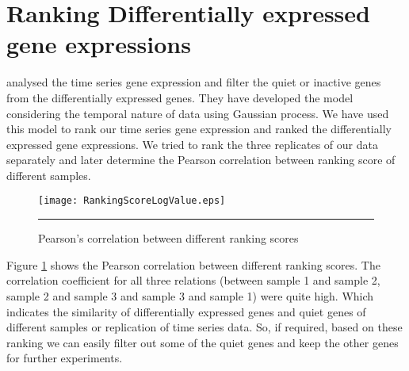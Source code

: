 \section{Ranking Differentially expressed gene expressions}
\cite{Kalaitzis:2011} analysed the time series gene expression and filter the quiet or inactive genes
from the differentially expressed genes. They have developed the model considering the temporal nature of data 
using Gaussian process. We have used this model to rank our time series gene expression and ranked the 
differentially expressed gene expressions. 
We tried to rank the three replicates of our data separately and later determine the
Pearson correlation between ranking score of different samples.

\begin{figure}
	\centering
		\texttt{[image: RankingScoreLogValue.eps]}
		\rule{35em}{0.5pt}
	\caption[Pearson's correlation between different ranking scores]
		{Pearson's correlation between different ranking scores}
	\label{fig:ranking_scores}
\end{figure}

Figure \ref{fig:ranking_scores} shows the Pearson correlation between different ranking scores.
The correlation coefficient for all three relations (between sample 1 and sample 2, sample 2 and sample 3 and
sample 3 and sample 1) were quite high. Which indicates the similarity of 
differentially expressed genes and quiet genes of different samples or replication of time series data.
So, if required, based on these ranking we can easily filter out some of the quiet genes and keep the
other genes for further experiments.


